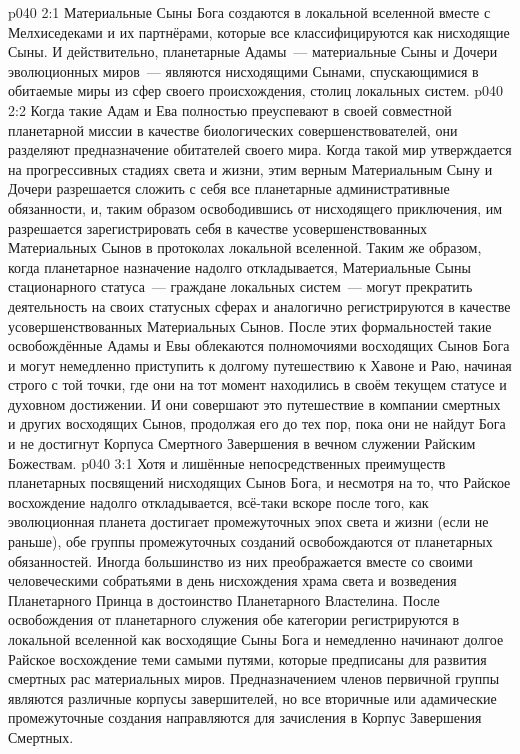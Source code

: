 \vs p040 2:1 Материальные Сыны Бога создаются в локальной вселенной вместе с Мелхиседеками и их партнёрами, которые все классифицируются как нисходящие Сыны. И действительно, планетарные Адамы~--- материальные Сыны и Дочери эволюционных миров~--- являются нисходящими Сынами, спускающимися в обитаемые миры из сфер своего происхождения, столиц локальных систем.
\vs p040 2:2 Когда такие Адам и Ева полностью преуспевают в своей совместной планетарной миссии в качестве биологических совершенствователей, они разделяют предназначение обитателей своего мира. Когда такой мир утверждается на прогрессивных стадиях света и жизни, этим верным Материальным Сыну и Дочери разрешается сложить с себя все планетарные административные обязанности, и, таким образом освободившись от нисходящего приключения, им разрешается зарегистрировать себя в качестве усовершенствованных Материальных Сынов в протоколах локальной вселенной. Таким же образом, когда планетарное назначение надолго откладывается, Материальные Сыны стационарного статуса~--- граждане локальных систем~--- могут прекратить деятельность на своих статусных сферах и аналогично регистрируются в качестве усовершенствованных Материальных Сынов. После этих формальностей такие освобождённые Адамы и Евы облекаются полномочиями восходящих Сынов Бога и могут немедленно приступить к долгому путешествию к Хавоне и Раю, начиная строго с той точки, где они на тот момент находились в своём текущем статусе и духовном достижении. И они совершают это путешествие в компании смертных и других восходящих Сынов, продолжая его до тех пор, пока они не найдут Бога и не достигнут Корпуса Смертного Завершения в вечном служении Райским Божествам.
\vs p040 3:1 Хотя и лишённые непосредственных преимуществ планетарных посвящений нисходящих Сынов Бога, и несмотря на то, что Райское восхождение надолго откладывается, всё\hyp{}таки вскоре после того, как эволюционная планета достигает промежуточных эпох света и жизни (если не раньше), обе группы промежуточных созданий освобождаются от планетарных обязанностей. Иногда большинство из них преображается вместе со своими человеческими собратьями в день нисхождения храма света и возведения Планетарного Принца в достоинство Планетарного Властелина. После освобождения от планетарного служения обе категории регистрируются в локальной вселенной как восходящие Сыны Бога и немедленно начинают долгое Райское восхождение теми самыми путями, которые предписаны для развития смертных рас материальных миров. Предназначением членов первичной группы являются различные корпусы завершителей, но все вторичные или адамические промежуточные создания направляются для зачисления в Корпус Завершения Смертных.
